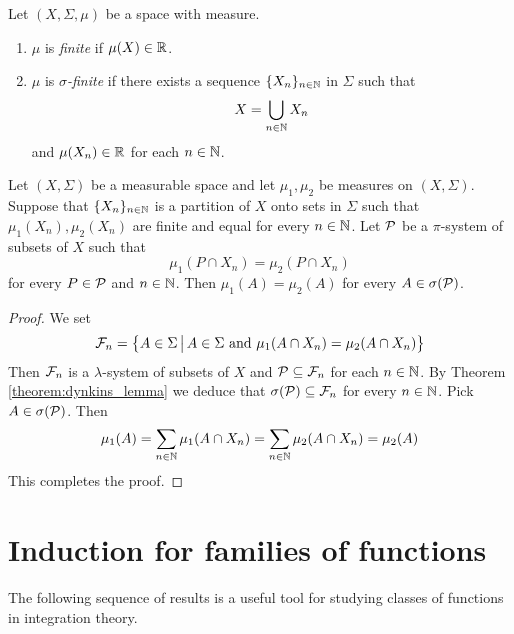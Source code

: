\begin{definition}
    Let $(X,\Sigma,\mu)$ be a space with measure.
    \begin{enumerate}[label=\textbf{(\arabic*)}, leftmargin=*]
        \item $\mu$ is \textit{finite} if $\mu(X) \in {\mathbb R}$.
        \item $\mu$ is \textit{$\sigma$-finite} if there exists a sequence $\{X_n\}_{n\in {\mathbb N}}$ in $\Sigma$ such that
              $$X = \bigcup_{n\in {\mathbb N}}X_n$$
              and $\mu(X_n)\in {\mathbb R}$ for each $n\in {\mathbb N}$.
    \end{enumerate}
\end{definition}

\begin{theorem}\label{theorem:uniqueness_of_sigma_finite_measure_on_pi_system}
    Let $(X,\Sigma)$ be a measurable space and let $\mu_1,\mu_2$ be measures on $(X,\Sigma)$. Suppose that $\{X_n\}_{n\in {\mathbb N}}$ is a partition of $X$ onto sets in $\Sigma$ such that $\mu_1(X_n),\mu_2(X_n)$ are finite and equal for every $n \in {\mathbb N}$. Let ${\mathcal P}$ be a $\pi$-system of subsets of $X$ such that 
    $$\mu_1(P\cap X_n) = \mu_2(P\cap X_n)$$
    for every $P \in {\mathcal P}$ and $n \in {\mathbb N}$. Then $\mu_1(A) = \mu_2(A)$ for every $A \in \sigma({\mathcal P})$.
\end{theorem}
\begin{proof}
    We set
    $${\mathcal F}_n = \big\{A\in \Sigma\,\big|\,A\in \Sigma \mbox{ and }\mu_1(A\cap X_n)=\mu_2(A\cap X_n) \big\}$$
    Then ${\mathcal F}_n$ is a $\lambda$-system of subsets of $X$ and ${\mathcal P} \subseteq {\mathcal F}_n$ for each $n \in {\mathbb N}$. By Theorem \ref{theorem:dynkins_lemma} we deduce that $\sigma({\mathcal P}) \subseteq {\mathcal F}_n$ for every $n \in {\mathbb N}$. Pick $A \in \sigma({\mathcal P})$. Then
    $$\mu_1(A) = \sum_{n\in {\mathbb N}}\mu_1(A\cap X_n) = \sum_{n\in {\mathbb N}}\mu_2(A\cap X_n) = \mu_2(A)$$
    This completes the proof.
\end{proof}


\section{Induction for families of functions}
\noindent
The following sequence of results is a useful tool for studying classes of functions in integration theory.

